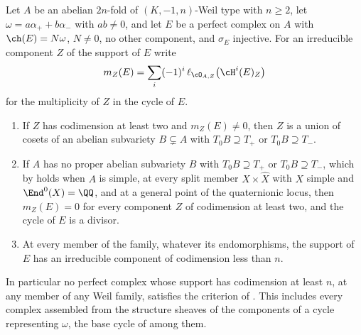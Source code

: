 \begin{theorem}
\label{thm:p2support}
Let $A$ be an abelian $2n$-fold of $(K,-1,n)$-Weil type with $n\ge2$, let
$\omega=a\alpha_{+}+b\alpha_{-}$ with $ab\ne0$, and let $E$ be a perfect
complex on $A$ with $\ch(E)=N\omega$, $N\ne0$, no other component, and
$\sigma_{E}$ injective. For an irreducible component $Z$ of the support of $E$
write
\[
  m_{Z}(E)=\sum_{i}(-1)^{i}\,\ell_{\cO_{A,Z}}\bigl(\cH^{i}(E)_{Z}\bigr)
\]
for the multiplicity of $Z$ in the cycle of $E$.
\begin{enumerate}[label=\textup{(\roman*)},leftmargin=2.6em,itemsep=2pt]
\item If $Z$ has codimension at least two and $m_{Z}(E)\ne0$, then $Z$ is a
  union of cosets of an abelian subvariety $B\subsetneq A$ with
  $T_{0}B\supseteq T_{+}$ or $T_{0}B\supseteq T_{-}$.
\item If $A$ has no proper abelian subvariety $B$ with $T_{0}B\supseteq T_{+}$
  or $T_{0}B\supseteq T_{-}$, which by  holds when $A$ is
  simple, at every split member $X\times\widehat X$ with $X$ simple and
  $\End^{0}(X)=\QQ$, and at a general point of the quaternionic locus, then
  $m_{Z}(E)=0$ for every component $Z$ of codimension at least two, and the
  cycle of $E$ is a divisor.
\item At every member of the family, whatever its endomorphisms, the support
  of $E$ has an irreducible component of codimension less than $n$.
\end{enumerate}
In particular no perfect complex whose support has codimension at least $n$,
at any member of any Weil family, satisfies the criterion of
. This includes every complex assembled from the
structure sheaves of the components of a cycle representing $\omega$, the base
cycle of  among them.
\end{theorem}

